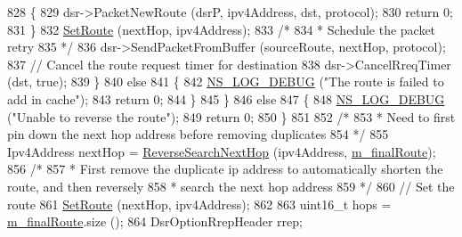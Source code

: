 \begin{DoxyCode}
828                         \{
829                           dsr->PacketNewRoute (dsrP, ipv4Address, dst, protocol);
830                           \textcolor{keywordflow}{return} 0;
831                         \}
832                       \hyperlink{classns3_1_1dsr_1_1DsrOptions_af749b76db4626ae64bc37001a5353b99}{SetRoute} (nextHop, ipv4Address);
833                       \textcolor{comment}{/*}
834 \textcolor{comment}{                       * Schedule the packet retry}
835 \textcolor{comment}{                       */}
836                       dsr->SendPacketFromBuffer (sourceRoute, nextHop, protocol);
837                       \textcolor{comment}{// Cancel the route request timer for destination}
838                       dsr->CancelRreqTimer (dst, \textcolor{keyword}{true});
839                     \}
840                   \textcolor{keywordflow}{else}
841                     \{
842                       \hyperlink{group__logging_ga413f1886406d49f59a6a0a89b77b4d0a}{NS\_LOG\_DEBUG} (\textcolor{stringliteral}{"The route is failed to add in cache"});
843                       \textcolor{keywordflow}{return} 0;
844                     \}
845                 \}
846               \textcolor{keywordflow}{else}
847                 \{
848                   \hyperlink{group__logging_ga413f1886406d49f59a6a0a89b77b4d0a}{NS\_LOG\_DEBUG} (\textcolor{stringliteral}{"Unable to reverse the route"});
849                   \textcolor{keywordflow}{return} 0;
850                 \}
851 
852               \textcolor{comment}{/*}
853 \textcolor{comment}{               * Need to first pin down the next hop address before removing duplicates}
854 \textcolor{comment}{               */}
855               Ipv4Address nextHop = \hyperlink{classns3_1_1dsr_1_1DsrOptions_a9cc1c0bdf1b57f8b2eea4d9070b26a58}{ReverseSearchNextHop} (ipv4Address, 
      \hyperlink{classns3_1_1dsr_1_1DsrOptions_a3fe6a72ebaae73724ce63383635b7af8}{m\_finalRoute});
856               \textcolor{comment}{/*}
857 \textcolor{comment}{               * First remove the duplicate ip address to automatically shorten the route, and then
       reversely}
858 \textcolor{comment}{               * search the next hop address}
859 \textcolor{comment}{               */}
860               \textcolor{comment}{// Set the route}
861               \hyperlink{classns3_1_1dsr_1_1DsrOptions_af749b76db4626ae64bc37001a5353b99}{SetRoute} (nextHop, ipv4Address);
862 
863               uint16\_t hops = \hyperlink{classns3_1_1dsr_1_1DsrOptions_a3fe6a72ebaae73724ce63383635b7af8}{m\_finalRoute}.size ();
864               DsrOptionRrepHeader rrep;

\end{DoxyCode}
